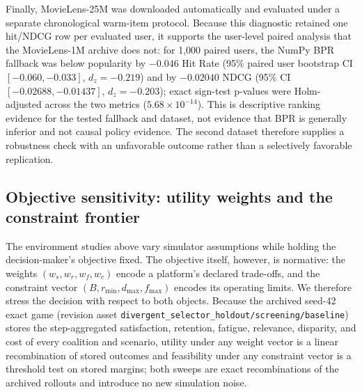 \documentclass[pdflatex,sn-mathphys-num]{sn-jnl}
\theoremstyle{thmstyleone}
\theoremstyle{thmstyletwo}
\theoremstyle{thmstylethree}
\begin{document}
\begin{table}[t]
\caption{Integrated scalability with real operator semantics (full configuration, seed 42). The $n=6$ rows are the archived primary game; the $n=8$ game integrates session-length cap and freshness quota as executed slate transformations.}\label{tab:integrated-scalability}
\centering
\scriptsize
\setlength{\tabcolsep}{3pt}
\end{table}

Finally, MovieLens-25M was downloaded automatically and evaluated under a separate chronological warm-item protocol. Because this diagnostic retained one hit/NDCG row per evaluated user, it supports the user-level paired analysis that the MovieLens-1M archive does not: for 1,000 paired users, the NumPy BPR fallback was below popularity by $-0.046$ Hit Rate (95\% paired user bootstrap CI $[-0.060,-0.033]$, $d_z=-0.219$) and by $-0.02040$ NDCG (95\% CI $[-0.02688,-0.01437]$, $d_z=-0.203$); exact sign-test p-values were Holm-adjusted across the two metrics ($5.68\times10^{-14}$). This is descriptive ranking evidence for the tested fallback and dataset, not evidence that BPR is generally inferior and not causal policy evidence. The second dataset therefore supplies a robustness check with an unfavorable outcome rather than a selectively favorable replication.

\subsection{Objective sensitivity: utility weights and the constraint frontier}\label{sec:objective-sensitivity}

The environment studies above vary simulator assumptions while holding the decision-maker's objective fixed. The objective itself, however, is normative: the weights $(w_s,w_r,w_f,w_c)$ encode a platform's declared trade-offs, and the constraint vector $(B,r_{\min},d_{\max},f_{\max})$ encodes its operating limits. We therefore stress the decision with respect to both objects. Because the archived seed-42 exact game (revision asset \texttt{divergent\_selector\_holdout/screening/baseline}) stores the step-aggregated satisfaction, retention, fatigue, relevance, disparity, and cost of every coalition and scenario, utility under any weight vector is a linear recombination of stored outcomes and feasibility under any constraint vector is a threshold test on stored margins; both sweeps are exact recombinations of the archived rollouts and introduce no new simulation noise.
\end{document}
